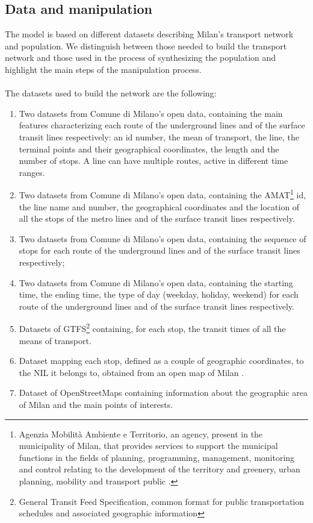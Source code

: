 \subsection{Data and manipulation}\label{sec3}
The model is based on different datasets describing Milan's transport network and population. We distinguish between those needed to build the transport network and those used in the process of synthesizing the population and highlight the main steps of the manipulation process.\\ \\
The datasets used to build the network are the following:
\begin{enumerate}
    \item Two datasets \cite{site1, site5} from Comune di Milano's open data, containing the main features characterizing each route of the underground lines and of the surface transit lines respectively: an id number, the mean of transport, the line, the terminal points and their geographical coordinates, the length and the number of stops. A line can have multiple routes, active in different time ranges.  
    \item Two datasets \cite{site2, site6} from Comune di Milano's open data, containing the AMAT\footnote{Agenzia Mobilità Ambiente e Territorio, an agency, present in the municipality of Milan, that provides services to support the municipal functions in the fields of planning, programming, management, monitoring and control relating to the development of the territory and greenery, urban planning, mobility and transport public \cite{site21}.} id, the line name and number, the geographical coordinates and the location of all the stops of the metro lines and of the surface transit lines respectively.
    \item Two datasets \cite{site3, site7} from Comune di Milano's open data, containing the sequence of stops for each route of the underground lines and of the surface transit lines respectively;
    \item Two datasets \cite{site4, site8} from Comune di Milano's open data, containing the starting time, the ending time, the type of day (weekday, holiday, weekend) for each route of the underground lines and  of the surface transit lines respectively. 
    \item Datasets \cite{site12} of GTFS\footnote{General Transit Feed Specification, common format for public transportation schedules and associated geographic information} containing, for each stop, the transit times of all the means of transport. 
    \item Dataset mapping each stop, defined as a couple of geographic coordinates, to the NIL it belongs to, obtained from an open map of Milan \cite{site22}.
    \item Dataset of OpenStreetMaps containing information about the geographic area of Milan and the main points of interests.
\end{enumerate} 
